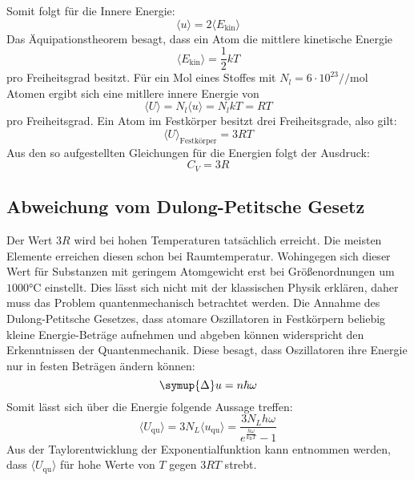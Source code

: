 Somit folgt für die Innere Energie:
\begin{equation}
  \langle u \rangle = 2 \langle E_\text{kin} \rangle
\end{equation}
Das Äquipationstheorem besagt, dass ein Atom die mittlere kinetische Energie
\begin{equation}
  \langle E_\text{kin} \rangle = \frac{1}{2}kT
\end{equation}
pro Freiheitsgrad besitzt.
Für ein Mol eines Stoffes mit $N_l=6 \cdot 10^23/\si{\per\mol}$\cite{v201} Atomen ergibt sich eine mitllere innere Energie von
\begin{equation}
  \langle U \rangle = N_l \langle u \rangle = N_l k T = R T
\end{equation}
pro Freiheitsgrad.
Ein Atom im Festkörper besitzt drei Freiheitsgrade, also gilt:
\begin{equation}
  \langle U \rangle _\text{Festkörper}= 3 R T
\end{equation}
Aus den so aufgestellten Gleichungen für die Energien folgt der Ausdruck:
\begin{equation}
\label{eqn:peitsche}
C_V = 3R
\end{equation}
\subsection{Abweichung vom Dulong-Petitsche Gesetz}
Der Wert $3R$ wird bei hohen Temperaturen tatsächlich erreicht.
Die meisten Elemente erreichen diesen schon bei Raumtemperatur.
Wohingegen sich dieser Wert für Substanzen mit geringem Atomgewicht erst bei
Größenordnungen um $1000\si{\celsius}$ einstellt.
Dies lässt sich nicht mit der klassischen Physik erklären,
daher muss das Problem quantenmechanisch betrachtet werden.
Die Annahme des Dulong-Petitsche Gesetzes, dass atomare Oszillatoren in Festkörpern
beliebig kleine Energie-Beträge aufnehmen und abgeben können widerspricht den Erkenntnissen der Quantenmechanik.
Diese besagt, dass Oszillatoren ihre Energie nur in festen Beträgen ändern können:
\begin{equation}
\symup{\Delta} u = n \hbar \omega
\end{equation}
Somit lässt sich über die Energie folgende Aussage treffen:
\begin{equation}
\langle U_\text{qu} \rangle = 3 N_L \langle u_\text{qu} \rangle = \frac{3 N_L h
\omega}{e^{\frac{h\omega}{k_\text{B}T}}-1}
\end{equation}
Aus der Taylorentwicklung der Exponentialfunktion kann entnommen werden,
dass $\langle U_\text{qu} \rangle$ für hohe Werte von $T$ gegen $3RT$ strebt.

